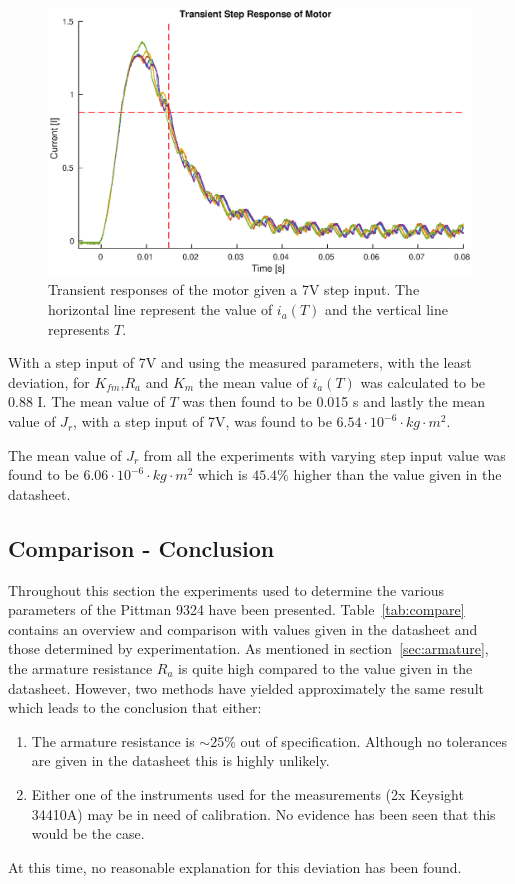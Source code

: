 \begin{figure}[!h]
	\centering
	\includegraphics[width=\linewidth]{graphics/transient_response_inertia}
	\caption{Transient responses of the motor given a 7V step input. The horizontal line represent the value of $i_a(T)$ and the vertical line represents $T$.}
	\label{fig:inertia_trans_plot}
\end{figure}

With a step input of 7V and using the measured parameters, with the least deviation, for $K_{fm}$,$R_a$ and $K_m$ the mean value of $i_a(T)$ was calculated to be 0.88 I. 
The mean value of $T$ was then found to be 0.015 s and lastly the mean value of $J_r$, with a step input of 7V, was found to be $6.54 \cdot 10^{-6} \cdot kg \cdot m^2$.

\par
The mean value of $J_r$ from all the experiments with varying step input value was found to be $ 6.06 \cdot 10^{-6} \cdot kg \cdot m^2$ which is $45.4\%$ higher than the value given in the datasheet. 

\subsection{Comparison - Conclusion}
Throughout this section the experiments used to determine the various parameters of the Pittman 9324 have been presented.
Table~\ref{tab:compare} contains an overview and comparison with values given in the datasheet and those determined by experimentation.
As mentioned in section~\ref{sec:armature}, the armature resistance $R_a$ is quite high compared to the value given in the datasheet.
However, two methods have yielded approximately the same result which leads to the conclusion that either:
\begin{enumerate}
	\item The armature resistance is $\sim25$\% out of specification. 
	Although no tolerances are given in the datasheet this is highly unlikely.
	\item Either one of the instruments used for the measurements (2x Keysight 34410A) may be in need of calibration. 
	No evidence has been seen that this would be the case.
\end{enumerate}
At this time, no reasonable explanation for this deviation has been found.

